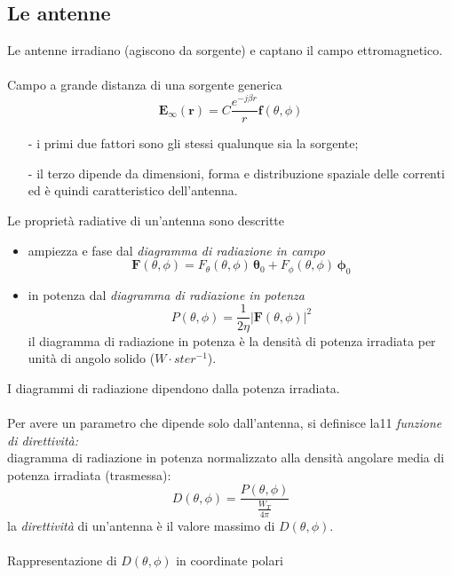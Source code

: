 \documentclass[a4paper]{article}
\begin{document}
\subsection*{Le antenne}
Le antenne irradiano (agiscono da sorgente) e captano il campo ettromagnetico.\\\\
Campo a grande distanza di una sorgente generica
\begin{equation*}
\textbf{E}_\infty(\textbf{r})=C\frac{e^{-j\beta r}}{r}\textbf{f}(\theta,\phi)
\end{equation*}
\begin{itemize}
\item[-] i primi due fattori sono gli stessi qualunque sia la sorgente;
\item[-] il terzo dipende da dimensioni, forma e distribuzione spaziale delle correnti ed è
quindi caratteristico dell’antenna.
\end{itemize}
Le proprietà radiative di un’antenna sono descritte
\begin{itemize}
\item  ampiezza e fase dal \emph{diagramma di radiazione in campo}
\begin{equation*}
\textbf{F}(\theta,\phi)=F_\theta(\theta,\phi)\,\bm{\theta}_0+F_\phi(\theta,\phi)\,\bm{\phi}_0
\end{equation*}
\item in potenza dal \emph{diagramma di radiazione in potenza}
\begin{equation*}
P(\theta,\phi)=\frac{1}{2\eta}|\textbf{F}(\theta,\phi)|^2
\end{equation*}
il diagramma di radiazione in potenza è la densità di potenza irradiata per unità di
angolo solido ($W\cdot ster^{-1}$).
\end{itemize}
I diagrammi di radiazione dipendono dalla potenza irradiata.\\\\
Per avere un parametro che dipende solo dall'antenna, si definisce la11
\emph{funzione di direttività:}\\
diagramma di radiazione in potenza normalizzato alla densità angolare media di
potenza irradiata (trasmessa):
\begin{equation*}
D(\theta,\phi)=\frac{P(\theta,\phi)}{\frac{W_T}{4\pi}}
\end{equation*}
la \emph{direttività} di un'antenna è il valore massimo di $D(\theta,\phi)$.\\\\
Rappresentazione di $D(\theta,\phi)$ in coordinate polari
\end{document}
